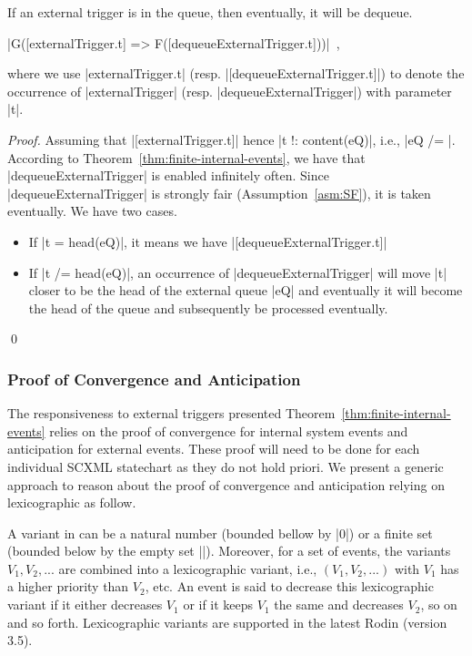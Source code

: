 \begin{theorem}
  \label{thm:resp-ext-trg}
  If an external trigger is in the queue, then eventually, it will be dequeue.
  \begin{center}
    |G([externalTrigger.t] => F([dequeueExternalTrigger.t]))|~,
  \end{center}
  where we use |externalTrigger.t|
  (resp. |[dequeueExternalTrigger.t]|) to denote the occurrence of
  |externalTrigger| (resp. |dequeueExternalTrigger|) with parameter |t|.
\end{theorem}
\begin{proof}
  Assuming that |[externalTrigger.t]| hence |t !: content(eQ)|, i.e.,
  |eQ /= {}|.  According to Theorem~\ref{thm:finite-internal-events},
  we have that |dequeueExternalTrigger| is enabled infinitely often.
  Since |dequeueExternalTrigger| is strongly fair
  (Assumption~\ref{asm:SF}), it is taken eventually. We have two
  cases.
  \begin{itemize}
  \item If |t = head(eQ)|, it means we have
    |[dequeueExternalTrigger.t]|
    
  \item If |t /= head(eQ)|, an occurrence of |dequeueExternalTrigger|
    will move |t| closer to be the head of the external queue |eQ| and
    eventually it will become the head of the queue and subsequently
    be processed eventually.
  \end{itemize}
  \qed
\end{proof}

\subsubsection{Proof of Convergence and Anticipation}
\label{sec:proof-convergence}
The responsiveness to external triggers presented
Theorem~\ref{thm:finite-internal-events} relies on the proof of
convergence for internal system events and anticipation for external
events. These proof will need to be done for each individual SCXML
statechart as they do not hold priori.  We present a generic approach
to reason about the proof of convergence and anticipation relying on
lexicographic as follow.

A variant in \EventB can be a natural number (bounded bellow by |0|)
or a finite set (bounded below by the empty set |{}|).  Moreover, for
a set of events, the variants $V_1, V_2, ...$ are combined into a
lexicographic variant, i.e., $(V_1, V_2, ...)$ with $V_1$ has a higher
priority than $V_2$, etc. An event is said to decrease this
lexicographic variant if it either decreases $V_1$ or if it keeps
$V_1$ the same and decreases $V_2$, so on and so forth.  Lexicographic
variants are supported in the latest Rodin (version 3.5).

